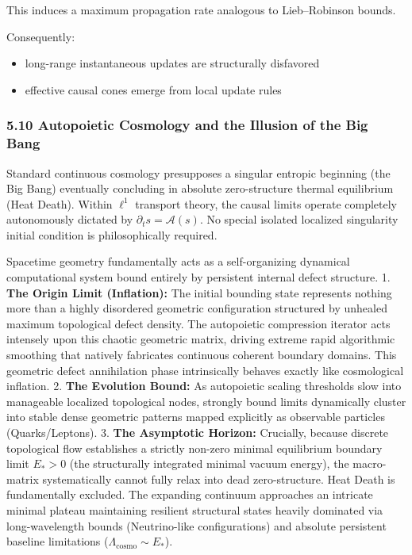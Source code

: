 \documentclass[
]{article}
\providecommand{\tightlist}{%
  \setlength{\itemsep}{0pt}\setlength{\parskip}{0pt}}
\begin{document}
This induces a maximum propagation rate analogous to Lieb--Robinson
bounds.

Consequently:

\begin{itemize}
\tightlist
\item
  long-range instantaneous updates are structurally disfavored
\item
  effective causal cones emerge from local update rules
\end{itemize}

\subsubsection{5.10 Autopoietic Cosmology and the Illusion of the Big
Bang}\label{autopoietic-cosmology-and-the-illusion-of-the-big-bang}

Standard continuous cosmology presupposes a singular entropic beginning
(the Big Bang) eventually concluding in absolute zero-structure thermal
equilibrium (Heat Death). Within \(\ell^1\) transport theory, the causal
limits operate completely autonomously dictated by
\(\partial_t s = \mathcal{A}(s)\). No special isolated localized
singularity initial condition is philosophically required.

Spacetime geometry fundamentally acts as a self-organizing dynamical
computational system bound entirely by persistent internal defect
structure. 1. \textbf{The Origin Limit (Inflation):} The initial
bounding state represents nothing more than a highly disordered
geometric configuration structured by unhealed maximum topological
defect density. The autopoietic compression iterator acts intensely upon
this chaotic geometric matrix, driving extreme rapid algorithmic
smoothing that natively fabricates continuous coherent boundary domains.
This geometric defect annihilation phase intrinsically behaves exactly
like cosmological inflation. 2. \textbf{The Evolution Bound:} As
autopoietic scaling thresholds slow into manageable localized
topological nodes, strongly bound limits dynamically cluster into stable
dense geometric patterns mapped explicitly as observable particles
(Quarks/Leptons). 3. \textbf{The Asymptotic Horizon:} Crucially, because
discrete topological flow establishes a strictly non-zero minimal
equilibrium boundary limit \(E_* > 0\) (the structurally integrated
minimal vacuum energy), the macro-matrix systematically cannot fully
relax into dead zero-structure. Heat Death is fundamentally excluded.
The expanding continuum approaches an intricate minimal plateau
maintaining resilient structural states heavily dominated via
long-wavelength bounds (Neutrino-like configurations) and absolute
persistent baseline limitations (\(\Lambda_{\text{cosmo}} \sim E_*\)).
\end{document}
